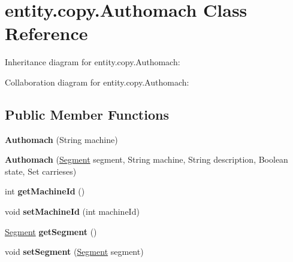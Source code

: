 \hypertarget{classentity_1_1copy_1_1_authomach}{}\section{entity.\+copy.\+Authomach Class Reference}
\label{classentity_1_1copy_1_1_authomach}


Inheritance diagram for entity.\+copy.\+Authomach\+:


Collaboration diagram for entity.\+copy.\+Authomach\+:
\subsection*{Public Member Functions}
\begin{DoxyCompactItemize}
\item 
\mbox{\label{classentity_1_1copy_1_1_authomach_a3e349d7d48beaeb7f0601235f605c639}} 
{\bfseries Authomach} (String machine)
\item 
\mbox{\label{classentity_1_1copy_1_1_authomach_ac8ff6c70f01e96099a69ebcc0b378be5}} 
{\bfseries Authomach} (\mbox{\hyperlink{classentity_1_1copy_1_1_segment}{Segment}} segment, String machine, String description, Boolean state, Set carrieses)
\item 
\mbox{\label{classentity_1_1copy_1_1_authomach_a58cc53cd5750a5cdbe1285f09adb7789}} 
int {\bfseries get\+Machine\+Id} ()
\item 
\mbox{\label{classentity_1_1copy_1_1_authomach_a2f759faf41a0fe3d47c668272f4bf51c}} 
void {\bfseries set\+Machine\+Id} (int machine\+Id)
\item 
\mbox{\label{classentity_1_1copy_1_1_authomach_a6920deffc9abe3959051b3bcd7646109}} 
\mbox{\hyperlink{classentity_1_1copy_1_1_segment}{Segment}} {\bfseries get\+Segment} ()
\item 
\mbox{\label{classentity_1_1copy_1_1_authomach_a68a60a7503bd412900005d906e1705c5}} 
void {\bfseries set\+Segment} (\mbox{\hyperlink{classentity_1_1copy_1_1_segment}{Segment}} segment)
\item 

\end{DoxyCompactItemize}
